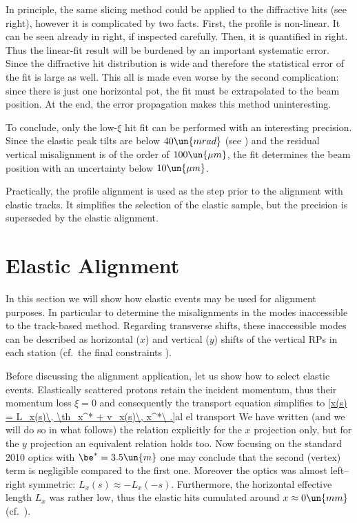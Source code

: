 In principle, the same slicing method could be applied to the diffractive hits (see  right), however it is complicated by two facts. First, the profile is non-linear. It can be seen already in  right, if inspected carefully.  Then, it is quantified in  right. Thus the linear-fit result will be burdened by an important systematic error. Since the diffractive hit distribution is wide and therefore the statistical error of the fit is large as well. This all is made even worse by the second complication: since there is just one horizontal pot, the fit must be extrapolated to the beam position. At the end, the error propagation makes this method uninteresting.



To conclude, only the low-$\xi$ hit fit can be performed with an interesting precision. Since the elastic peak tilts are below $40\un{mrad}$ (see ) and the residual vertical misalignment is of the order of $100\un{\mu m}$, the fit determines the beam position with an uncertainty below $10\un{\mu m}$.


Practically, the profile alignment is used as the step prior to the alignment with elastic tracks. It simplifies the selection of the elastic sample, but the precision is superseded by the elastic alignment.

\section[al elast]{Elastic Alignment}

In this section we will show how elastic events may be used for alignment purposes. In particular to determine the misalignments in the modes inaccessible to the track-based method. Regarding transverse shifts, these inaccessible modes can be described as horizontal ($x$) and vertical ($y$) shifts of the vertical RPs in each station (cf.~the final constraints ).

Before discussing the alignment application, let us show how to select elastic events. Elastically scattered protons retain the incident momentum, thus their momentum loss $\xi = 0$ and consequently the transport equation  simplifies to
\eqref{x(s) = L_x(s)\, \th_x^* + v_x(s)\, x^*\ .}{al el transport}
We have written (and we will do so in what follows) the relation explicitly for the $x$ projection only, but for the $y$ projection an equivalent relation holds too. Now focusing on the standard 2010 optics with $\be^*=3.5\un{m}$ one may conclude that the second (vertex) term is negligible compared to the first one. Moreover the optics was almost left--right symmetric: $L_x(s) \approx - L_x(-s)$. Furthermore, the horizontal effective length $L_x$ was rather low, thus the elastic hits cumulated around $x\approx 0\un{mm}$ (cf.~).


